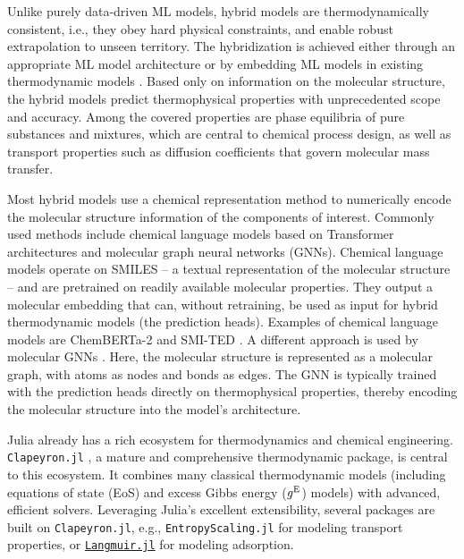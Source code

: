 \documentclass{juliacon}
\begin{document}
Unlike purely data-driven ML models, hybrid models are thermodynamically consistent, i.e., they obey hard physical constraints, and enable robust extrapolation to unseen territory.
The hybridization is achieved either through an appropriate ML model architecture \cite{specht_hanna_2024-1,hoffmann_machine-learned_2025} or by embedding ML models in existing thermodynamic models \cite{wagner_hybrid_2026-1, hayer_advancing_2025,hoffmann_grappahybrid_2025,hayer_modified_2025}.
Based only on information on the molecular structure, the hybrid models predict thermophysical properties with unprecedented scope and accuracy. 
Among the covered properties are phase equilibria of pure substances and mixtures, which are central to chemical process design, as well as transport properties such as diffusion coefficients \cite{wagner_hybrid_2026-1,wagner_composition-dependent_2026} that govern molecular mass transfer.

Most hybrid models use a chemical representation method to numerically encode the molecular structure information of the components of interest. Commonly used methods include chemical language models based on Transformer architectures and molecular graph neural networks (GNNs). 
Chemical language models operate on SMILES \cite{weininger_smiles_1988} -- a textual representation of the molecular structure -- and are pretrained on readily available molecular properties.
They output a molecular embedding that can, without retraining, be used as input for hybrid thermodynamic models (the prediction heads).
Examples of chemical language models are ChemBERTa-2 \cite{ahmad_chemberta-2_2022} and SMI-TED \cite{soares_open-source_2025}.
A different approach is used by molecular GNNs \cite{wieder_compact_2020}. Here, the molecular structure is represented as a molecular graph, with atoms as nodes and bonds as edges. The GNN is typically trained with the prediction heads directly on thermophysical properties, thereby encoding the molecular structure into the model's architecture.

Julia already has a rich ecosystem for thermodynamics and chemical engineering. 
\texttt{Clapeyron.jl} \cite{walker_clapeyronjl_2022}, a mature and comprehensive thermodynamic package, is central to this ecosystem. It combines many classical thermodynamic models (including equations of state (EoS) and excess Gibbs energy ($g^{\rm E}$) models) with advanced, efficient solvers. Leveraging Julia's excellent extensibility, several packages are built on \texttt{Clapeyron.jl}, e.g., \texttt{EntropyScaling.jl} \cite{schmitt_se-schmittentropyscalingjl_2026} for modeling transport properties, or \href{https://github.com/ClapeyronThermo/Langmuir.jl}{\texttt{Langmuir.jl}} \cite{santana_langmuirjl_nodate} for modeling adsorption.
\end{document}
